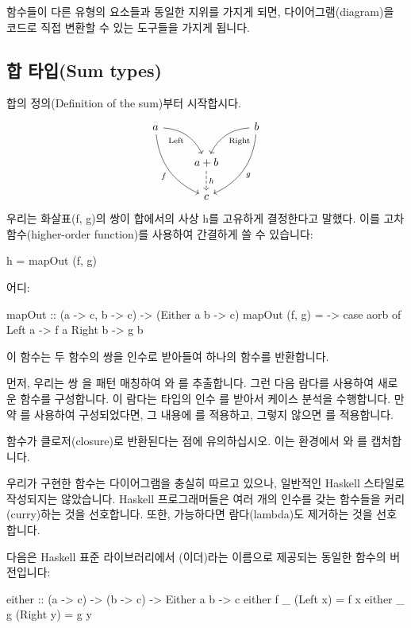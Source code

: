 \documentclass[DaoFP]{subfiles}
\begin{document}
함수들이 다른 유형의 요소들과 동일한 지위를 가지게 되면, 다이어그램(diagram)을 코드로 직접 변환할 수 있는 도구들을 가지게 됩니다.

\subsection{합 타입(Sum types)}

합의 정의(Definition of the sum)부터 시작합시다.
\[
 \begin{tikzcd}
 a
 \arrow[dr,  bend left, "\text{Left}"']
 \arrow[ddr, bend right, "f"']
 && b
 \arrow[dl, bend right, "\text{Right}"]
 \arrow[ddl, bend left, "g"]
 \\
&a + b
\arrow[d, dashed, "h"]
\\
& c
 \end{tikzcd}
\]
우리는 화살표(f, g)의 쌍이 합에서의 사상 h를 고유하게 결정한다고 말했다. 이를 고차 함수(higher-order function)를 사용하여 간결하게 쓸 수 있습니다:
\begin{haskell}
h = mapOut (f, g)
\end{haskell}
어디:
\begin{haskell}
mapOut :: (a -> c, b -> c) -> (Either a b -> c)
mapOut (f, g) = \aorb -> case aorb of
                         Left  a -> f a
                         Right b -> g b
\end{haskell}
이 함수는 두 함수의 쌍을 인수로 받아들여 하나의 함수를 반환합니다.

먼저, 우리는 쌍 을 패턴 매칭하여 와 를 추출합니다. 그런 다음 람다를 사용하여 새로운 함수를 구성합니다. 이 람다는  타입의 인수 를 받아서 케이스 분석을 수행합니다. 만약 를 사용하여 구성되었다면, 그 내용에 를 적용하고, 그렇지 않으면 를 적용합니다.

함수가 클로저(closure)로 반환된다는 점에 유의하십시오. 이는 환경에서 와 를 캡처합니다.

우리가 구현한 함수는 다이어그램을 충실히 따르고 있으나, 일반적인 Haskell 스타일로 작성되지는 않았습니다. Haskell 프로그래머들은 여러 개의 인수를 갖는 함수들을 커리(curry)하는 것을 선호합니다. 또한, 가능하다면 람다(lambda)도 제거하는 것을 선호합니다.

다음은 Haskell 표준 라이브러리에서 (이더)라는 이름으로 제공되는 동일한 함수의 버전입니다:
\begin{haskell}
either :: (a -> c) -> (b -> c) -> Either a b -> c
either f _ (Left x)     =  f x
either _ g (Right y)    =  g y
\end{haskell}
\end{document}
